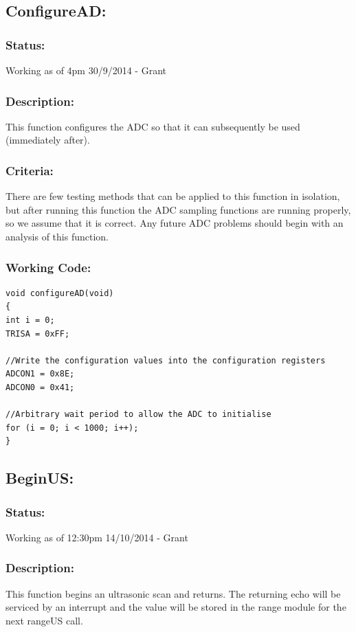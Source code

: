 \documentclass[]{report}
\begin{document}
\subsection{ConfigureAD:}
\subsubsection{Status:}
Working as of 4pm 30/9/2014 - Grant

\subsubsection{Description:}
This function configures the ADC so that it can subsequently be used (immediately after).

\subsubsection{Criteria:}
There are few testing methods that can be applied to this function in isolation, but after running this function the ADC sampling functions are running properly, so we assume that it is correct. Any future ADC problems should begin with an analysis of this function.

\subsubsection{Working Code:}
\begin{lstlisting}
void configureAD(void)
{
int i = 0;
TRISA = 0xFF;

//Write the configuration values into the configuration registers
ADCON1 = 0x8E;
ADCON0 = 0x41;

//Arbitrary wait period to allow the ADC to initialise
for (i = 0; i < 1000; i++);
}
\end{lstlisting}

\subsection{BeginUS:}
\subsubsection{Status:}
Working as of 12:30pm 14/10/2014 - Grant

\subsubsection{Description:}
This function begins an ultrasonic scan and returns. The returning echo will be serviced by an interrupt and the value will be stored in the range module for the next rangeUS call.
\end{document}
